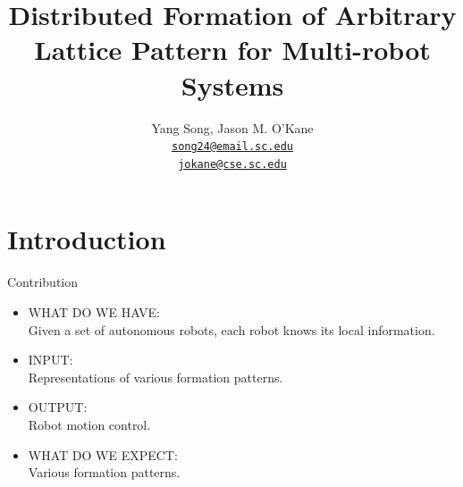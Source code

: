 \documentclass[10pt]{beamer}
\title{Distributed Formation of Arbitrary Lattice Pattern for
  Multi-robot Systems}
\author{
  Yang Song, Jason M. O'Kane\\
  \href{mailto:song24@email.sc.edu}{{\tt song24@email.sc.edu} \\
  \href{mailto:jokane@cse.sc.edu}{\tt jokane@cse.sc.edu}}
}
\institute[
  Dept.\ of Computer Science and Engineering\\
  University of South Carolina
] %
{%
  Dept. of Computer Science and Engineering\\
  University of South Carolina
  
}
\begin{document}
\begin{frame}[plain] %
  \titlepage
\end{frame}

\section{Introduction}
\begin{frame}{Contribution}{}
\begin{block}{}
  \begin{itemize}
  \item {\textcolor{scred}{\large WHAT DO WE HAVE:}}\\
    Given a set of autonomous robots, each robot knows its local information.
  \item {\textcolor{scred}{\large INPUT:}}\\
    Representations of various formation patterns.
  \item {\textcolor{scred}{\large OUTPUT:}}\\
    Robot motion control.
  \item {\textcolor{scred}{\large WHAT DO WE EXPECT:}}\\
    Various formation patterns.
  \end{itemize}
\end{block}
\end{frame}

\end{document}
